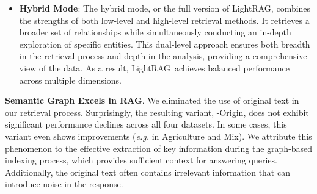 \documentclass{article} %
\def\model{LightRAG}
\begin{document}
\begin{itemize}[leftmargin=*]
    \item \textbf{Hybrid Mode}: The hybrid mode, or the full version of \model, combines the strengths of both low-level and high-level retrieval methods. It retrieves a broader set of relationships while simultaneously conducting an in-depth exploration of specific entities. This dual-level approach ensures both breadth in the retrieval process and depth in the analysis, providing a comprehensive view of the data. As a result, \model\ achieves balanced performance across multiple dimensions.
    
\end{itemize}

\textbf{Semantic Graph Excels in RAG}.
We eliminated the use of original text in our retrieval process. Surprisingly, the resulting variant, -Origin, does not exhibit significant performance declines across all four datasets. In some cases, this variant even shows improvements (\textit{e.g.} in Agriculture and Mix). We attribute this phenomenon to the effective extraction of key information during the graph-based indexing process, which provides sufficient context for answering queries. Additionally, the original text often contains irrelevant information that can introduce noise in the response.
\end{document}
